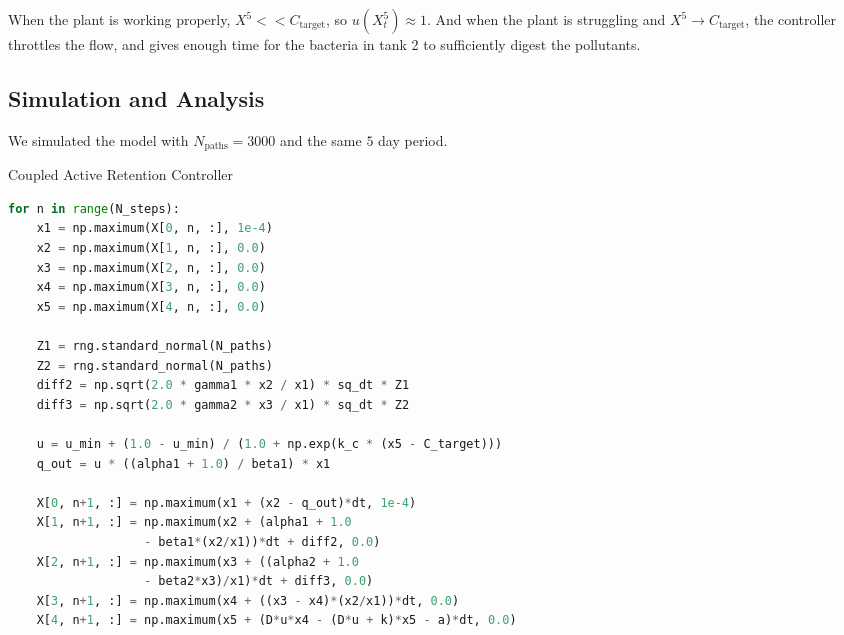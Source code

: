\documentclass[conference]{IEEEtran}
\renewcommand{\medskip}{\vspace{1\baselineskip}}
\theoremstyle{definitionsc}
\theoremstyle{plainsc}
\theoremstyle{remarksc}
\begin{document}
When the plant is working properly, $X^5 << C_\text{target}$, so $u(X_t^5)\approx 1$. And when the plant is struggling and $X^5\rightarrow C_\text{target}$, the controller throttles the flow, and gives enough time for the bacteria in tank 2 to sufficiently digest the pollutants.


\medskip




\subsection{\textbf{Simulation and Analysis}}

We simulated the model with $N_\text{paths} = 3000$ and the same $5$ day period.






\begin{algorithm}[htbp]
\caption{Coupled Active Retention Controller}
\label{alg:active_controller}
\begin{lstlisting}[language=Python]
for n in range(N_steps):
    x1 = np.maximum(X[0, n, :], 1e-4)
    x2 = np.maximum(X[1, n, :], 0.0)
    x3 = np.maximum(X[2, n, :], 0.0)
    x4 = np.maximum(X[3, n, :], 0.0)
    x5 = np.maximum(X[4, n, :], 0.0)

    Z1 = rng.standard_normal(N_paths)
    Z2 = rng.standard_normal(N_paths)
    diff2 = np.sqrt(2.0 * gamma1 * x2 / x1) * sq_dt * Z1
    diff3 = np.sqrt(2.0 * gamma2 * x3 / x1) * sq_dt * Z2

    u = u_min + (1.0 - u_min) / (1.0 + np.exp(k_c * (x5 - C_target)))
    q_out = u * ((alpha1 + 1.0) / beta1) * x1

    X[0, n+1, :] = np.maximum(x1 + (x2 - q_out)*dt, 1e-4)
    X[1, n+1, :] = np.maximum(x2 + (alpha1 + 1.0 
                   - beta1*(x2/x1))*dt + diff2, 0.0)
    X[2, n+1, :] = np.maximum(x3 + ((alpha2 + 1.0 
                   - beta2*x3)/x1)*dt + diff3, 0.0)
    X[3, n+1, :] = np.maximum(x4 + ((x3 - x4)*(x2/x1))*dt, 0.0)
    X[4, n+1, :] = np.maximum(x5 + (D*u*x4 - (D*u + k)*x5 - a)*dt, 0.0)
\end{lstlisting}
\end{algorithm}
\end{document}

